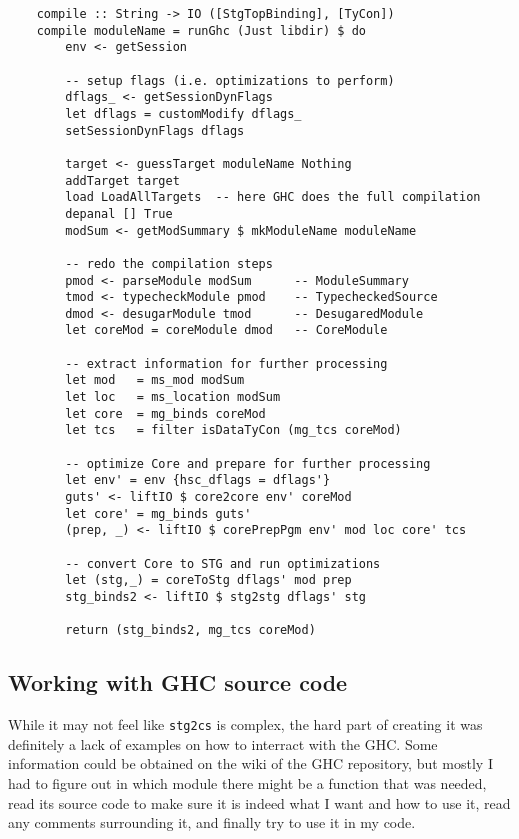 \documentclass[en]{pracamgr}
\begin{document}
\begin{verbatim}
    compile :: String -> IO ([StgTopBinding], [TyCon])
    compile moduleName = runGhc (Just libdir) $ do
        env <- getSession
        
        -- setup flags (i.e. optimizations to perform)
        dflags_ <- getSessionDynFlags
        let dflags = customModify dflags_
        setSessionDynFlags dflags

        target <- guessTarget moduleName Nothing
        addTarget target
        load LoadAllTargets  -- here GHC does the full compilation
        depanal [] True
        modSum <- getModSummary $ mkModuleName moduleName

        -- redo the compilation steps
        pmod <- parseModule modSum      -- ModuleSummary
        tmod <- typecheckModule pmod    -- TypecheckedSource
        dmod <- desugarModule tmod      -- DesugaredModule
        let coreMod = coreModule dmod   -- CoreModule

        -- extract information for further processing
        let mod   = ms_mod modSum
        let loc   = ms_location modSum
        let core  = mg_binds coreMod
        let tcs   = filter isDataTyCon (mg_tcs coreMod)

        -- optimize Core and prepare for further processing
        let env' = env {hsc_dflags = dflags'}
        guts' <- liftIO $ core2core env' coreMod
        let core' = mg_binds guts' 
        (prep, _) <- liftIO $ corePrepPgm env' mod loc core' tcs

        -- convert Core to STG and run optimizations
        let (stg,_) = coreToStg dflags' mod prep
        stg_binds2 <- liftIO $ stg2stg dflags' stg

        return (stg_binds2, mg_tcs coreMod)
\end{verbatim}

\subsection{Working with GHC source code}
While it may not feel like \texttt{stg2cs} is complex,
the hard part of creating it was definitely a lack of
examples on how to interract with the GHC.
Some information could be obtained on the wiki of the GHC
repository, but mostly I had to figure out in which
module there might be a function that was needed,
read its source code to make sure it is indeed what
I want and how to use it, read any comments surrounding it,
and finally try to use it in my code.
\end{document}
